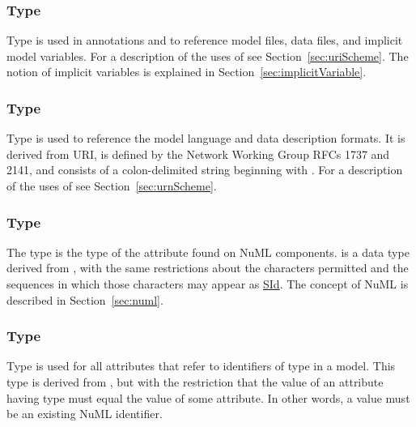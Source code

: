 \subsubsection[\element{anyURI}]{Type }
\label{type:anyURI}
Type  is used in annotations and to reference model files, data files, and implicit model variables. For a description of the uses of  see Section~\ref{sec:uriScheme}.  The notion of implicit variables is explained in Section~\ref{sec:implicitVariable}.

\subsubsection[\element{URN}]{Type }
\label{type:urn}
Type  is used to reference the model language and data description formats.  It is derived from URI, is defined by the Network Working Group RFCs 1737 and 2141, and consists of a colon-delimited string beginning with .  For a description of the uses of  see Section~\ref{sec:urnScheme}.

\subsubsection[\element{NuMLSId}]{Type }
\label{type:numlsid}
The type  is the type of the  attribute found on NuML components.  is a data type derived from \SId, with the same restrictions about the characters permitted and the sequences in which those characters may appear as \hyperref[type:sid]{SId}. The concept of NuML is described in Section~\ref{sec:numl}.

\subsubsection[\element{NuMLSIdRef}]{Type }
\label{type:numlsidref}
Type  is used for all attributes that refer to identifiers of type \hyperref[type:numlsid]{} in a model. This type is derived from \hyperref[type:numlsid]{}, but with the restriction that the value of an attribute having type  must equal the value of some \hyperref[type:numlsid]{} attribute. In other words, a  value must be an existing NuML identifier.

